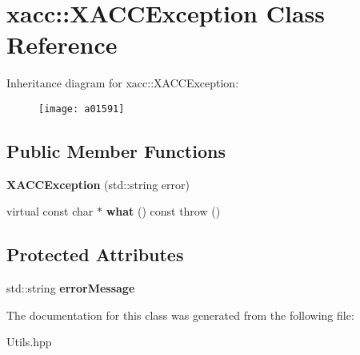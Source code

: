\hypertarget{a01591}{}\section{xacc\+:\+:X\+A\+C\+C\+Exception Class Reference}
\label{a01591}
Inheritance diagram for xacc\+:\+:X\+A\+C\+C\+Exception\+:\begin{figure}[H]
\begin{center}
\leavevmode
\texttt{[image: a01591]}
\end{center}
\end{figure}
\subsection*{Public Member Functions}
\begin{DoxyCompactItemize}
\item 
\mbox{\label{a01591_ab62415ce6e1dd25fb1a074f5741007c9}} 
{\bfseries X\+A\+C\+C\+Exception} (std\+::string error)
\item 
\mbox{\label{a01591_a86612df9215beec1933229c5dddc12e5}} 
virtual const char $\ast$ {\bfseries what} () const  throw ()
\end{DoxyCompactItemize}
\subsection*{Protected Attributes}
\begin{DoxyCompactItemize}
\item 
\mbox{\label{a01591_a31f64c6fb215570571b9b4a3d47eadd0}} 
std\+::string {\bfseries error\+Message}
\end{DoxyCompactItemize}


The documentation for this class was generated from the following file\+:\begin{DoxyCompactItemize}
\item 
Utils.\+hpp\end{DoxyCompactItemize}
